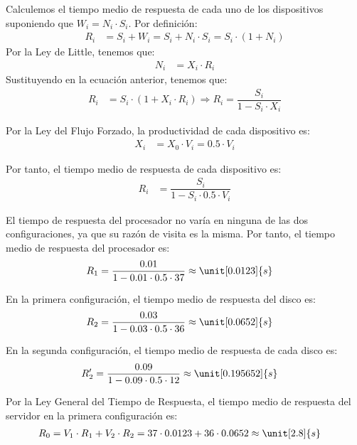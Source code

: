 \begin{ejercicio}
\begin{enumerate}
        Calculemos el tiempo medio de respuesta de cada uno de los dispositivos suponiendo que $W_i = N_i \cdot S_i$. Por definición:
        \begin{align*}
            R_i &= S_i + W_i = S_i + N_i \cdot S_i = S_i \cdot (1 + N_i)
        \end{align*}
        Por la Ley de Little, tenemos que:
        \begin{align*}
            N_i &= X_i \cdot R_i
        \end{align*}
        Sustituyendo en la ecuación anterior, tenemos que:
        \begin{align*}
            R_i &= S_i \cdot (1 + X_i \cdot R_i)
            \Longrightarrow R_i = \dfrac{S_i}{1 - S_i \cdot X_i}
        \end{align*}

        Por la Ley del Flujo Forzado, la productividad de cada dispositivo es:
        \begin{align*}
            X_i &= X_0 \cdot V_i = 0.5 \cdot V_i
        \end{align*}

        Por tanto, el tiempo medio de respuesta de cada dispositivo es:
        \begin{align*}
            R_i &= \dfrac{S_i}{1 - S_i \cdot 0.5 \cdot V_i}
        \end{align*}

        El tiempo de respuesta del procesador no varía en ninguna de las dos configuraciones, ya que su razón de visita es la misma. Por tanto, el tiempo medio de respuesta del procesador es:
        \begin{align*}
            R_1 &= \dfrac{0.01}{1 - 0.01 \cdot 0.5 \cdot 37} \approx \unit[0.0123]{s}
        \end{align*}

        En la primera configuración, el tiempo medio de respuesta del disco es:
        \begin{align*}
            R_2 &= \dfrac{0.03}{1 - 0.03 \cdot 0.5 \cdot 36} \approx \unit[0.0652]{s}
        \end{align*}

        En la segunda configuración, el tiempo medio de respuesta de cada disco es:
        \begin{align*}
            R_2' &= \dfrac{0.09}{1 - 0.09 \cdot 0.5 \cdot 12} \approx \unit[0.195652]{s}
        \end{align*}

        Por la Ley General del Tiempo de Respuesta, el tiempo medio de respuesta del servidor en la primera configuración es:
        \begin{align*}
            R_0 &= V_1 \cdot R_1 + V_2 \cdot R_2 = 37 \cdot 0.0123 + 36 \cdot 0.0652 \approx \unit[2.8]{s}
        \end{align*}


\end{enumerate}
\end{ejercicio}
